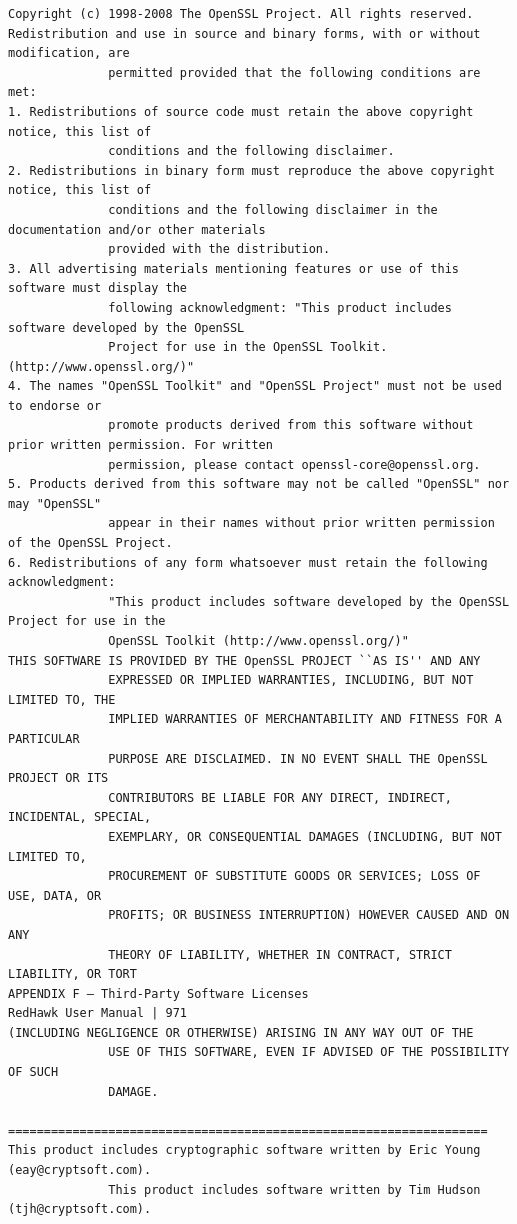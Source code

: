 \begin{lstlisting}[basicstyle=\ttfamily\scriptsize,breaklines=true]
Copyright (c) 1998-2008 The OpenSSL Project. All rights reserved.
Redistribution and use in source and binary forms, with or without modification, are
              permitted provided that the following conditions are met:
1. Redistributions of source code must retain the above copyright notice, this list of
              conditions and the following disclaimer.
2. Redistributions in binary form must reproduce the above copyright notice, this list of
              conditions and the following disclaimer in the documentation and/or other materials
              provided with the distribution.
3. All advertising materials mentioning features or use of this software must display the
              following acknowledgment: "This product includes software developed by the OpenSSL
              Project for use in the OpenSSL Toolkit. (http://www.openssl.org/)"
4. The names "OpenSSL Toolkit" and "OpenSSL Project" must not be used to endorse or
              promote products derived from this software without prior written permission. For written
              permission, please contact openssl-core@openssl.org.
5. Products derived from this software may not be called "OpenSSL" nor may "OpenSSL"
              appear in their names without prior written permission of the OpenSSL Project.
6. Redistributions of any form whatsoever must retain the following acknowledgment:
              "This product includes software developed by the OpenSSL Project for use in the
              OpenSSL Toolkit (http://www.openssl.org/)"
THIS SOFTWARE IS PROVIDED BY THE OpenSSL PROJECT ``AS IS'' AND ANY
              EXPRESSED OR IMPLIED WARRANTIES, INCLUDING, BUT NOT LIMITED TO, THE
              IMPLIED WARRANTIES OF MERCHANTABILITY AND FITNESS FOR A PARTICULAR
              PURPOSE ARE DISCLAIMED. IN NO EVENT SHALL THE OpenSSL PROJECT OR ITS
              CONTRIBUTORS BE LIABLE FOR ANY DIRECT, INDIRECT, INCIDENTAL, SPECIAL,
              EXEMPLARY, OR CONSEQUENTIAL DAMAGES (INCLUDING, BUT NOT LIMITED TO,
              PROCUREMENT OF SUBSTITUTE GOODS OR SERVICES; LOSS OF USE, DATA, OR
              PROFITS; OR BUSINESS INTERRUPTION) HOWEVER CAUSED AND ON ANY
              THEORY OF LIABILITY, WHETHER IN CONTRACT, STRICT LIABILITY, OR TORT
APPENDIX F — Third-Party Software Licenses                                   RedHawk User Manual | 971
(INCLUDING NEGLIGENCE OR OTHERWISE) ARISING IN ANY WAY OUT OF THE
              USE OF THIS SOFTWARE, EVEN IF ADVISED OF THE POSSIBILITY OF SUCH
              DAMAGE.
              ===================================================================
This product includes cryptographic software written by Eric Young (eay@cryptsoft.com).
              This product includes software written by Tim Hudson (tjh@cryptsoft.com).
\end{lstlisting}

